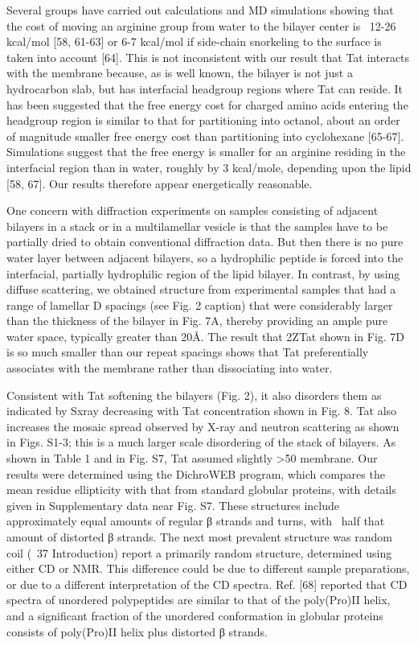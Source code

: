 Several groups have carried out calculations and MD simulations showing that the cost of
moving an arginine group from water to the bilayer center is ~12-26 kcal/mol [58, 61-63] or 6-7
kcal/mol if side-chain snorkeling to the surface is taken into account [64]. This is not inconsistent
with our result that Tat interacts with the membrane because, as is well known, the bilayer is not
just a hydrocarbon slab, but has interfacial headgroup regions where Tat can reside. It has been
suggested that the free energy cost for charged amino acids entering the headgroup region is
similar to that for partitioning into octanol, about an order of magnitude smaller free energy cost
than partitioning into cyclohexane [65-67]. Simulations suggest that the free energy is smaller
for an arginine residing in the interfacial region than in water, roughly by 3 kcal/mole, depending
upon the lipid [58, 67]. Our results therefore appear energetically reasonable.

One concern with diffraction experiments on samples consisting of adjacent bilayers in a
stack or in a multilamellar vesicle is that the samples have to be partially dried to obtain
conventional diffraction data. But then there is no pure water layer between adjacent bilayers, so
a hydrophilic peptide is forced into the interfacial, partially hydrophilic region of the lipid
bilayer. In contrast, by using diffuse scattering, we obtained structure from experimental
samples that had a range of lamellar D spacings (see Fig. 2 caption) that were considerably
larger than the thickness of the bilayer in Fig. 7A, thereby providing an ample pure water space,
typically greater than 20Å. The result that 2ZTat shown in Fig. 7D is so much smaller than our
repeat spacings shows that Tat preferentially associates with the membrane rather than
dissociating into water.

Consistent with Tat softening the bilayers (Fig. 2), it also disorders them as indicated by
Sxray decreasing with Tat concentration shown in Fig. 8. Tat also increases the mosaic spread
observed by X-ray and neutron scattering as shown in Figs. S1-3; this is a much larger scale
disordering of the stack of bilayers. As shown in Table 1 and in Fig. S7, Tat assumed slightly
>50%
membrane. Our results were determined using the DichroWEB program, which compares the
mean residue ellipticity with that from standard globular proteins, with details given in
Supplementary data near Fig. S7. These structures include approximately equal amounts of
regular β strands and turns, with ~half that amount of distorted β strands. The next most
prevalent structure was random coil (~37%
Introduction) report a primarily random structure, determined using either CD or NMR. This
difference could be due to different sample preparations, or due to a different interpretation of
the CD spectra. Ref. [68] reported that CD spectra of unordered polypeptides are similar to that
of the poly(Pro)II helix, and a significant fraction of the unordered conformation in globular
proteins consists of poly(Pro)II helix plus distorted β strands.

